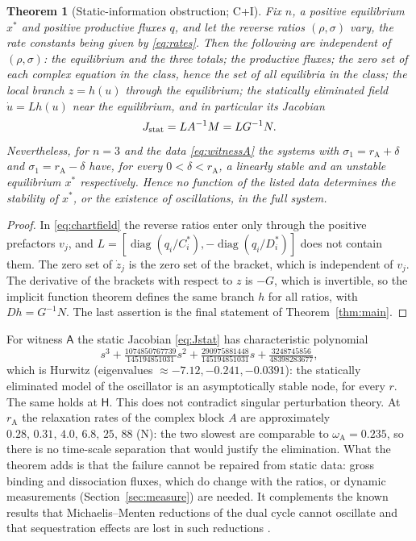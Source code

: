 \documentclass[11pt,a4paper]{article}
\theoremstyle{plain}
\newtheorem{theorem}{Theorem}[section]
\theoremstyle{definition}
\theoremstyle{remark}
\newcommand{\rA}{r_{\mathrm A}}
\newcommand{\omA}{\omega_{\mathrm A}}
\newcommand{\WA}{\mathsf A}
\newcommand{\WH}{\mathsf H}
\DeclareMathOperator{\diag}{diag}
\newcommand{\evC}{\textsf{C}}
\newcommand{\evI}{\textsf{I}}
\newcommand{\evN}{\textsf{N}}
\begin{document}
\begin{theorem}[Static-information obstruction; \evC+\evI]\label{thm:static}
Fix $n$, a positive equilibrium $x^*$ and positive productive fluxes $q$, and let the reverse ratios $(\rho,\sigma)$ vary, the rate constants being given by \eqref{eq:rates}. Then the following are independent of $(\rho,\sigma)$:
the equilibrium and the three totals; the productive fluxes; the zero set of each complex equation in the class, hence the set of all equilibria in the class; the local branch $z=h(u)$ through the equilibrium; the statically eliminated field $\dot u=Lh(u)$ near the equilibrium, and in particular its Jacobian
\begin{equation}\label{eq:Jstat}
 J_{\rm stat}=LA^{-1}M=LG^{-1}N .
\end{equation}
Nevertheless, for $n=3$ and the data \eqref{eq:witnessA} the systems with $\sigma_1=\rA+\delta$ and $\sigma_1=\rA-\delta$ have, for every $0<\delta<\rA$, a linearly stable and an unstable equilibrium $x^*$ respectively. Hence no function of the listed data determines the stability of $x^*$, or the existence of oscillations, in the full system.
\end{theorem}
\begin{proof}
In \eqref{eq:chartfield} the reverse ratios enter only through the positive prefactors $v_j$, and $L=[\diag(q_i/C_i^*),-\diag(q_i/D_i^*)]$ does not contain them. The zero set of $\dot z_j$ is the zero set of the bracket, which is independent of $v_j$. The derivative of the brackets with respect to $z$ is $-G$, which is invertible, so the implicit function theorem defines the same branch $h$ for all ratios, with $Dh=G^{-1}N$. The last assertion is the final statement of Theorem~\ref{thm:main}.
\end{proof}
For witness $\WA$ the static Jacobian \eqref{eq:Jstat} has characteristic polynomial
\[
 s^3+\tfrac{1074850767739}{145194851031}s^2+\tfrac{290975881448}{145194851031}s+\tfrac{3248745856}{48398283677},
\]
which is Hurwitz (eigenvalues $\approx-7.12,-0.241,-0.0391$): the statically eliminated model of the oscillator is an asymptotically stable node, for every $r$. The same holds at $\WH$. This does not contradict singular perturbation theory. At $\rA$ the relaxation rates of the complex block $A$ are approximately $0.28,\,0.31,\,4.0,\,6.8,\,25,\,88$ (\evN): the two slowest are comparable to $\omA=0.235$, so there is no time-scale separation that would justify the elimination. What the theorem adds is that the failure cannot be repaired from static data: gross binding and dissociation fluxes, which do change with the ratios, or dynamic measurements (Section~\ref{sec:measure}) are needed. It complements the known results that Michaelis--Menten reductions of the dual cycle cannot oscillate \cite{BozemanMorales17,Tung18} and that sequestration effects are lost in such reductions \cite{Bluthgen06,Ciliberto07}.
\end{document}
